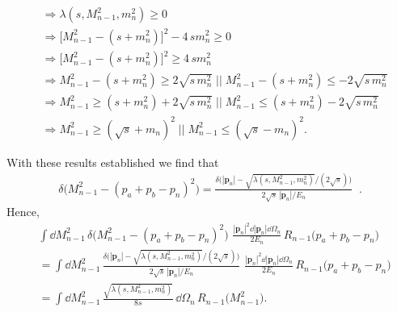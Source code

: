 \begin{enumerate}[label=(\roman*)]
\begin{align*}
        &\Rightarrow \lambda(s, M_{n-1}^2, m_n^2) \geq 0\\
        &\Rightarrow 
        \big[
            M_{n-1}^2 - (s + m_n^2)
        \big]^2
        - 4\,s m_n^2
        \geq 0\\
        &\Rightarrow
        \big[
            M_{n-1}^2 - (s + m_n^2)
        \big]^2
        \geq 4\,s m_n^2\\
        &\Rightarrow
            M_{n-1}^2 - (s + m_n^2) \geq 2 \sqrt{s\, m_n^2} 
            \; \big|\big| \;
            M_{n-1}^2 - (s + m_n^2) \leq - 2 \sqrt{s\, m_n^2}  \\
            &\Rightarrow
            M_{n-1}^2 \geq (s + m_n^2) + 2 \sqrt{s\, m_n^2} 
            \; \big|\big| \;
            M_{n-1}^2 \leq (s + m_n^2) - 2 \sqrt{s\, m_n^2}  \\
            &\Rightarrow
            \boxed{
                M_{n-1}^2 \geq (\sqrt{s} + m_n)^2
                \; \big|\big| \;
                M_{n-1}^2 \leq (\sqrt{s} - m_n)^2.
            }
    \end{align*}
    
\end{enumerate}
With these results established we find that 
\begin{align}
    \delta \big( M_{n-1}^2 - (p_a + p_b - p_n)^2 \big)
    = \frac{
        \delta \Big(
        |\bm{p}_n| - \sqrt{\lambda(s, M_{n-1}^2, m_n^2)} \Big/ (2 \sqrt{s})    
    \Big)
    }
    {
        2 \sqrt{s}\, |\bm{p}_n| / E_n
    }\;\;.
\end{align}
Hence,
\begin{align*}
    &\int \dd M_{n-1}^2 \, \delta\big(M_{n-1}^2 - (p_a + p_b - p_n)^2\big) \,
    \, \frac{|\bm{p}_n|^2 \dd |\bm{p}_n| \dd \Omega_n}{2 E_n} \,
    R_{n-1}\big(p_a + p_b - p_n\big)\\
    &= 
    \int \dd M_{n-1}^2 \, 
    \frac{
        \delta \Big(
        |\bm{p}_n| - \sqrt{\lambda(s, M_{n-1}^2, m_n^2)} \Big/ (2 \sqrt{s})    
    \Big)
    }
    {
        2 \sqrt{s}\, |\bm{p}_n| / E_n
    }
    \,
    \, \frac{|\bm{p}_n|^2 \dd |\bm{p}_n| \dd \Omega_n}{2 E_n} \,
    R_{n-1}\big(p_a + p_b - p_n\big) \\
    &=
    \int \dd M_{n-1}^2 \, 
    \frac{\sqrt{\lambda(s, M_{n-1}^2, m_n^2)}}{8 s}
    \, \dd \Omega_n \,
    R_{n-1}\big(M_{n-1}^2).
\end{align*}
